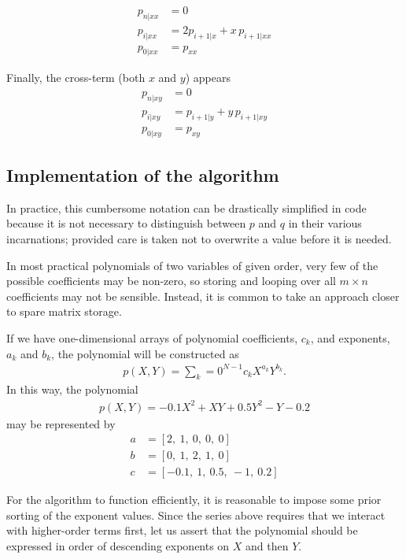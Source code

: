 \documentclass[twocolumn,letterpaper,11pt]{article}
\begin{document}
\begin{subequations}
\begin{align}
p_{n|xx} &= 0\\
p_{i|xx} &= 2 p_{i+1|x} + x\,p_{i+1|xx}\\
p_{0|xx} &= p_{xx}
\end{align}
\end{subequations}

Finally, the cross-term (both $x$ and $y$) appears
\begin{subequations}
\begin{align}
p_{n|xy} &= 0\\
p_{i|xy} &= p_{i+1|y} + y\,p_{i+1|xy}\\
p_{0|xy} &= p_{xy}
\end{align}
\end{subequations}

\subsection{Implementation of the algorithm}
In practice, this cumbersome notation can be drastically simplified in code because it is not necessary to distinguish between $p$ and $q$ in their various incarnations; provided care is taken not to overwrite a value before it is needed.

In most practical polynomials of two variables of given order, very few of the possible coefficients may be non-zero, so storing and looping over all $m\times n$ coefficients may not be sensible.  Instead, it is common to take an approach closer to spare matrix storage.

If we have one-dimensional arrays of polynomial coefficients, $c_k$, and exponents, $a_k$ and $b_k$, the polynomial will be constructed as
\begin{align}
p(X,Y) = \sum_k=0^{N-1} c_k X^{a_k} Y^{b_k}.
\end{align}
In this way, the polynomial
\begin{align}
p(X,Y) = -0.1 X^2 + XY + 0.5 Y^2 - Y - 0.2
\end{align}
may be represented by
\begin{align}
a &= \left[ 2,\ 1,\ 0,\ 0,\ 0\right]\\
b &= \left[ 0,\ 1,\ 2,\ 1,\ 0\right]\\
c &= \left[ -0.1,\ 1,\ 0.5,\ -1,\ 0.2\right]
\end{align}

For the algorithm to function efficiently, it is reasonable to impose some prior sorting of the exponent values.  Since the series above requires that we interact with higher-order terms first, let us assert that the polynomial should be expressed in order of descending exponents on $X$ and then $Y$.
\end{document}
